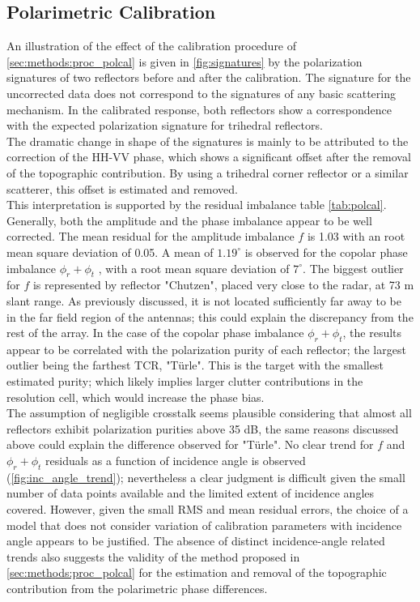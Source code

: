 \subsection{Polarimetric Calibration}
An illustration of the effect of the calibration procedure of \autoref{sec:methods:proc_polcal} is given in  \autoref{fig:signatures} by the polarization signatures of two reflectors before and after the calibration.
The signature for the uncorrected data does not correspond to the signatures of any basic scattering mechanism. In the calibrated response, both reflectors show a correspondence with the expected polarization signature for trihedral reflectors.\\ The dramatic change in shape of the signatures is mainly to be attributed to the correction of the HH-VV phase, which shows a significant offset after the removal of the topographic contribution. By using a trihedral corner reflector or a similar scatterer, this offset is estimated and removed.\\
This interpretation is supported by the residual imbalance table \autoref{tab:polcal}.
Generally, both the amplitude and the phase imbalance appear to be well corrected. The mean residual for the amplitude imbalance $f$ is 1.03 with an root mean square deviation of 0.05. A mean of $1.19^\circ$ is observed for the copolar phase imbalance $\phi_r + \phi_t$ , with a root mean square deviation of $7^\circ$. The biggest outlier for $f$ is represented by reflector "Chutzen", placed very close to the radar, at 73 m slant range. As previously discussed, it is not located sufficiently far away to be in the far field region of the antennas; this could explain the discrepancy from the rest of the array. In the case of the copolar phase imbalance $\phi_r + \phi_t$, the results appear to be correlated with the polarization purity of each reflector; the largest outlier being the farthest TCR, "T\"{u}rle". This is the target with the smallest estimated purity; which likely implies larger clutter contributions in the resolution cell, which would increase the phase bias.\\
The assumption of negligible crosstalk seems plausible considering that almost all reflectors exhibit polarization purities above 35 dB, the same reasons discussed above could explain the difference observed for  "T\"{u}rle".
No clear trend for $f$ and $\phi_r + \phi_t$ residuals as a function of incidence angle is observed (\autoref{fig:inc_angle_trend}); nevertheless a clear judgment is difficult given the small number of data points available and the limited extent of incidence angles covered. However, given the small RMS and mean residual errors, the choice of a model that does not consider variation of calibration parameters with incidence angle appears to be justified. The absence of distinct incidence-angle related trends also suggests the validity of the method proposed in \autoref{sec:methods:proc_polcal} for the estimation and removal of the topographic contribution from the polarimetric phase differences.\\
